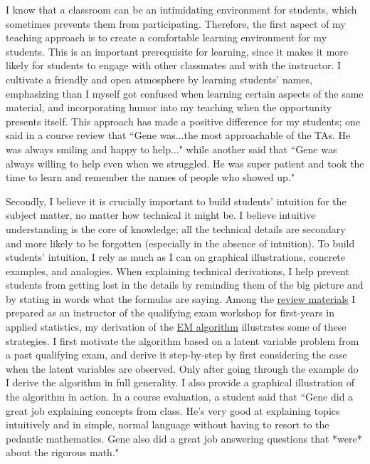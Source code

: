 \documentclass[11pt]{article}
\begin{document}
I know that a classroom can be an intimidating environment for students, which sometimes prevents them from participating. Therefore, the first aspect of my teaching approach is to create a comfortable learning environment for my students. This is an important prerequisite for learning, since it makes it more likely for students to engage with other classmates and with the instructor. I cultivate a friendly and open atmosphere by learning students' names, emphasizing than I myself got confused when learning certain aspects of the same material, and incorporating humor into my teaching when the opportunity presents itself. This approach has made a positive difference for my students; one said in a course review that ``Gene was...the most approachable of the TAs. He was always smiling and happy to help..." while another said that ``Gene was always willing to help even when we struggled. He was super patient and took the time to learn and remember the names of people who showed up."

Secondly, I believe it is crucially important to build students' intuition for the subject matter, no matter how technical it might be. I believe intuitive understanding is the core of knowledge; all the technical details are secondary and more likely to be forgotten (especially in the absence of intuition). To build students' intuition, I rely as much as I can on graphical illustrations, concrete examples, and analogies. When explaining technical derivations, I help prevent students from getting lost in the details by reminding them of the big picture and by stating in words what the formulas are saying. Among the \href{http://web.stanford.edu/~ekatsevi/STATS302/}{review materials} I prepared as an instructor of the qualifying exam workshop for first-years in applied statistics, my derivation of the \href{http://web.stanford.edu/~ekatsevi/STATS302/EM.pdf}{EM algorithm} illustrates some of these strategies. I first motivate the algorithm based on a latent variable problem from a past qualifying exam, and derive it step-by-step by first considering the case when the latent variables are observed. Only after going through the example do I derive the algorithm in full generality. I also provide a graphical illustration of the algorithm in action. In a course evaluation, a student said that ``Gene did a great job explaining concepts from class. He's very good at explaining topics intuitively and in simple, normal language without having to resort to the pedantic mathematics. Gene also did a great job answering questions that *were* about the rigorous math."
\end{document}
